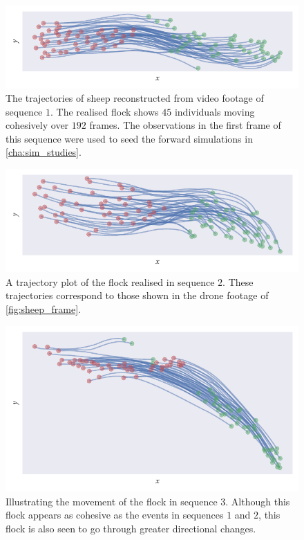 \begin{figure}[tbp]
  \includegraphics{seq_1_traj.pdf}
  \caption{The trajectories of sheep reconstructed from video footage of
    sequence $1$. The realised flock shows $45$ individuals moving cohesively
    over $192$ frames. The observations in the first frame of this sequence were
    used to seed the forward simulations in \cref{cha:sim_studies}.}
  \label{fig:seq_1_traj}
\end{figure}
\begin{figure}[tbp]
  \includegraphics{seq_2_traj.pdf}
  \caption{A trajectory plot of the flock realised in sequence $2$. These
    trajectories correspond to those shown in the drone footage of
  \cref{fig:sheep_frame}.}
  \label{fig:seq_2_traj}
\end{figure}
\begin{figure}[tbp]
  \includegraphics{seq_3_traj.pdf}
  \caption{Illustrating the movement of the flock in sequence $3$. Although
    this flock appears as cohesive as the events in sequences $1$ and $2$,
    this flock is also seen to go through greater directional changes.}
  \label{fig:seq_3_traj}
\end{figure}


